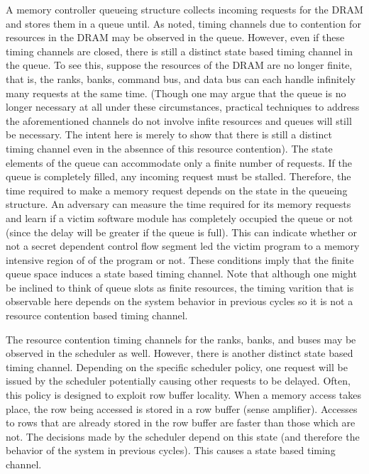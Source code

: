 A memory controller queueing structure collects incoming requests for the DRAM 
and stores them in a queue until. As noted, timing channels due to contention 
for resources in the
DRAM may be observed in the queue. However, even if these timing channels are 
closed, there is still a distinct state based timing channel in the queue. To 
see this, suppose the resources of the DRAM are no longer finite, that is, the 
ranks, banks, command bus, and data bus can each handle infinitely many 
requests at the same time. (Though one may argue that the queue is no longer 
necessary at all under these circumstances, practical techniques to address the 
aforementioned channels do not involve infite resources and queues will still 
be necessary. The intent here is merely to show that there is still a distinct 
timing channel even in the absennce of this resource contention).
The state elements of the queue can accommodate only a finite number of 
requests. If the queue is completely filled, any incoming request must be 
stalled. Therefore, the time required to make a memory request depends on the 
state in the queueing structure. An adversary can measure the time required for 
its memory requests and learn if a victim software module has completely 
occupied the queue or not (since the delay will be greater if the queue is 
full). This can indicate whether or not a secret dependent control flow segment 
led the victim program to a memory intensive region of of the program or not.  
These conditions imply that the finite queue space induces a state based timing 
channel. Note that although one might be inclined to think of queue slots as 
finite resources, the timing varition that is observable here depends on the 
system behavior in previous cycles so it is not a resource contention based 
timing channel.

The resource contention timing channels for the ranks, banks, and buses may be 
observed in the scheduler as well. However, there is another distinct state 
based timing channel. Depending on the specific scheduler policy, one request 
will be issued by the scheduler potentially causing other requests to be 
delayed.  Often, this policy is designed to exploit row buffer locality.  When 
a memory access takes place, the row being accessed is stored in a row buffer 
(sense amplifier). Accesses to rows that are already stored in the row buffer 
are faster than those which are not. The decisions made by the scheduler depend 
on this state (and therefore the behavior of the system in previous cycles).  
This causes a state based timing channel.
